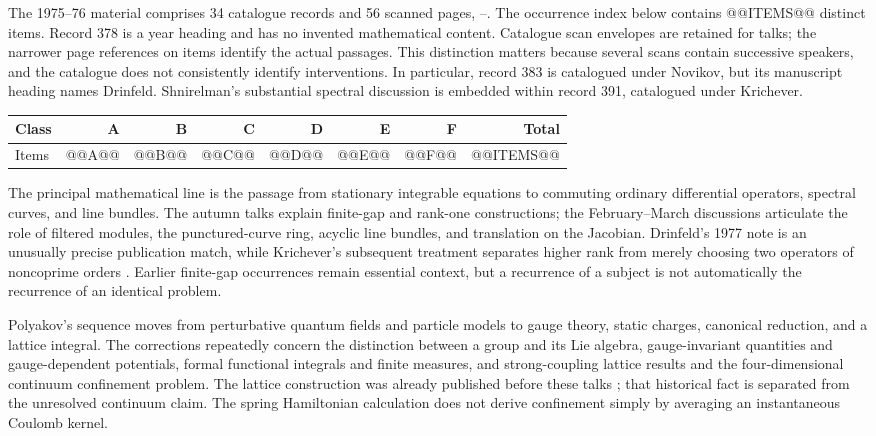 The 1975--76 material comprises 34 catalogue records and 56 scanned pages,
--. The occurrence index below contains
@@ITEMS@@ distinct items. Record 378 is a year heading and has no invented
mathematical content. Catalogue scan envelopes are retained for talks;
the narrower page references on items identify the actual passages.
This distinction matters because several scans contain successive
speakers, and the catalogue does not consistently identify interventions.
In particular, record 383 is catalogued under Novikov, but its manuscript
heading names Drinfeld. Shnirelman's substantial spectral discussion is
embedded within record 391, catalogued under Krichever.

\begin{center}
\begin{tabular}{lrrrrrrr}
\toprule
Class&A&B&C&D&E&F&Total\\
\midrule
Items&@@A@@&@@B@@&@@C@@&@@D@@&@@E@@&@@F@@&@@ITEMS@@\\
\bottomrule
\end{tabular}
\end{center}

The principal mathematical line is the passage from stationary integrable
equations to commuting ordinary differential operators, spectral curves,
and line bundles. The autumn talks explain finite-gap and rank-one
constructions; the February--March discussions articulate the role of
filtered modules, the punctured-curve ring, acyclic line bundles, and
translation on the Jacobian. Drinfeld's 1977 note is an unusually precise
publication match, while Krichever's subsequent treatment separates
higher rank from merely choosing two operators of noncoprime orders
\citep{drinfeld1977commutative,krichever1978commutative}.
Earlier finite-gap occurrences remain essential context, but a recurrence
of a subject is not automatically the recurrence of an identical problem.

Polyakov's sequence moves from perturbative quantum fields and particle
models to gauge theory, static charges, canonical reduction, and a
lattice integral. The corrections repeatedly concern the distinction
between a group and its Lie algebra, gauge-invariant quantities and
gauge-dependent potentials, formal functional integrals and finite
measures, and strong-coupling lattice results and the four-dimensional
continuum confinement problem. The lattice construction was already
published before these talks \citep{wilson1974confinement}; that historical
fact is separated from the unresolved continuum claim. The spring
Hamiltonian calculation does not derive confinement simply by averaging
an instantaneous Coulomb kernel.

